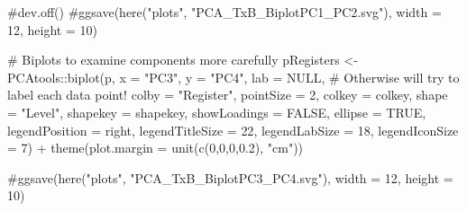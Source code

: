 \documentclass[
  letterpaper,
  DIV=11,
  numbers=noendperiod]{scrreprt}
\newenvironment{Shaded}{\begin{snugshade}}{\end{snugshade}}
\newcommand{\AttributeTok}[1]{\textcolor[rgb]{0.40,0.45,0.13}{#1}}
\newcommand{\CommentTok}[1]{\textcolor[rgb]{0.37,0.37,0.37}{#1}}
\newcommand{\ConstantTok}[1]{\textcolor[rgb]{0.56,0.35,0.01}{#1}}
\newcommand{\DecValTok}[1]{\textcolor[rgb]{0.68,0.00,0.00}{#1}}
\newcommand{\FloatTok}[1]{\textcolor[rgb]{0.68,0.00,0.00}{#1}}
\newcommand{\FunctionTok}[1]{\textcolor[rgb]{0.28,0.35,0.67}{#1}}
\newcommand{\NormalTok}[1]{\textcolor[rgb]{0.00,0.23,0.31}{#1}}
\newcommand{\OtherTok}[1]{\textcolor[rgb]{0.00,0.23,0.31}{#1}}
\newcommand{\SpecialCharTok}[1]{\textcolor[rgb]{0.37,0.37,0.37}{#1}}
\newcommand{\StringTok}[1]{\textcolor[rgb]{0.13,0.47,0.30}{#1}}
\begin{document}
\begin{Shaded}
\begin{Highlighting}[]
\CommentTok{\#dev.off()}
\CommentTok{\#ggsave(here("plots", "PCA\_TxB\_BiplotPC1\_PC2.svg"), width = 12, height = 10)}

\CommentTok{\# Biplots to examine components more carefully}
\NormalTok{pRegisters }\OtherTok{\textless{}{-}}\NormalTok{ PCAtools}\SpecialCharTok{::}\FunctionTok{biplot}\NormalTok{(p,}
                 \AttributeTok{x =} \StringTok{"PC3"}\NormalTok{,}
                 \AttributeTok{y =} \StringTok{"PC4"}\NormalTok{,}
                 \AttributeTok{lab =} \ConstantTok{NULL}\NormalTok{, }\CommentTok{\# Otherwise will try to label each data point!}
                 \AttributeTok{colby =} \StringTok{"Register"}\NormalTok{,}
                 \AttributeTok{pointSize =} \DecValTok{2}\NormalTok{,}
                 \AttributeTok{colkey =}\NormalTok{ colkey,}
                 \AttributeTok{shape =} \StringTok{"Level"}\NormalTok{,}
                 \AttributeTok{shapekey =}\NormalTok{ shapekey,}
                 \AttributeTok{showLoadings =} \ConstantTok{FALSE}\NormalTok{,}
                 \AttributeTok{ellipse =} \ConstantTok{TRUE}\NormalTok{,}
                 \AttributeTok{legendPosition =} \StringTok{\textquotesingle{}right\textquotesingle{}}\NormalTok{,}
                 \AttributeTok{legendTitleSize =} \DecValTok{22}\NormalTok{,}
                 \AttributeTok{legendLabSize =} \DecValTok{18}\NormalTok{, }
                 \AttributeTok{legendIconSize =} \DecValTok{7}\NormalTok{) }\SpecialCharTok{+}
  \FunctionTok{theme}\NormalTok{(}\AttributeTok{plot.margin =} \FunctionTok{unit}\NormalTok{(}\FunctionTok{c}\NormalTok{(}\DecValTok{0}\NormalTok{,}\DecValTok{0}\NormalTok{,}\DecValTok{0}\NormalTok{,}\FloatTok{0.2}\NormalTok{), }\StringTok{"cm"}\NormalTok{))}

\CommentTok{\#ggsave(here("plots", "PCA\_TxB\_BiplotPC3\_PC4.svg"), width = 12, height = 10)}


\end{Highlighting}
\end{Shaded}
\end{document}
